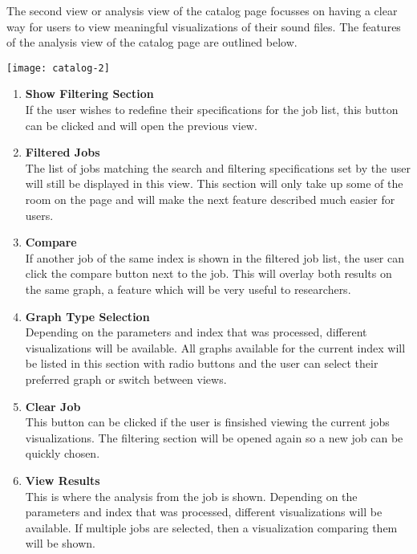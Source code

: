 The second view or analysis view of the catalog page focusses on having a clear way for users to view meaningful visualizations of their sound files. The features of the analysis view of the catalog page are outlined below.\par
\texttt{[image: catalog-2]}
\begin{enumerate}
    \item \textbf{Show Filtering Section}\\ If the user wishes to redefine their specifications for the job list, this button can be clicked and will open the previous view.
    \item \textbf{Filtered Jobs}\\ The list of jobs matching the search and filtering specifications set by the user will still be displayed in this view. This section will only take up some of the room on the page and will make the next feature described much easier for users.
    \item \textbf{Compare}\\ If another job of the same index is shown in the filtered job list, the user can click the compare button next to the job. This will overlay both results on the same graph, a feature which will be very useful to researchers.
    \item \textbf{Graph Type Selection}\\ Depending on the parameters and index that was processed, different visualizations will be available. All graphs available for the current index will be listed in this section with radio buttons and the user can select their preferred graph or switch between views.
    \item \textbf{Clear Job}\\ This button can be clicked if the user is finsished viewing the current job\textquotesingle s visualizations. The filtering section will be opened again so a new job can be quickly chosen.
    \item \textbf{View Results}\\ This is where the analysis from the job is shown. Depending on the parameters and index that was processed, different visualizations will be available. If multiple jobs are selected, then a visualization comparing them will be shown.
\end{enumerate}